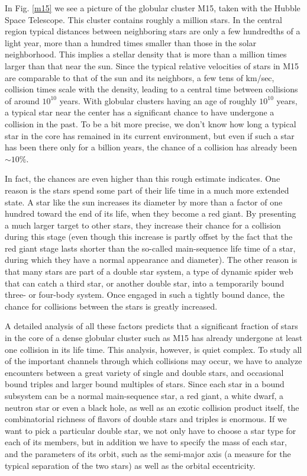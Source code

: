 \documentclass{book}
\begin{document}
In Fig. \ref{m15} we see a
picture of the globular cluster M15, taken with the Hubble Space
Telescope.  This cluster contains roughly a million stars.  In the
central region typical distances between neighboring stars are only a
few hundredths of a light year, more than a hundred times smaller than
those in the solar neighborhood.  This implies a stellar density that
is more than a million times larger than that near the sun.  Since the
typical relative velocities of stars in M15 are comparable to that of
the sun and its neighbors, a few tens of km/sec, collision times scale
with the density, leading to a central time between collisions of around
 $10^{10}$ years.  With globular clusters having an age of
roughly  $10^{10}$ years, a typical star near the center has
a significant chance to have undergone a collision in the past.  To be
a bit more precise, we don't know how long a typical star in the core
has remained in its current environment, but even if such a star has
been there only for a billion years, the chance of a collision has
already been  $\sim10\%$.

In fact, the chances are even higher than this rough estimate indicates.
One reason is the stars spend some part of their life time in a much
more extended state.  A star like the sun increases its diameter by
more than a factor of one hundred toward the end of its life, when
they become a red giant.  By presenting a much larger target to other
stars, they increase their chance for a collision during this stage
(even though this increase is partly offset by the fact that the red
giant stage lasts shorter than the so-called main-sequence life time
of a star, during which they have a normal appearance and diameter).
The other reason is that many stars are part of a double star system,
a type of dynamic spider web that can catch a third star, or another
double star, into a temporarily bound three- or four-body system.
Once engaged in such a tightly bound dance, the chance for collisions
between the stars is greatly increased.

A detailed analysis of all these factors predicts that a significant
fraction of stars in the core of a dense globular cluster such as M15
has already undergone at least one collision in its life time.  This
analysis, however, is quiet complex.  To study all of the important
channels through which collisions may occur, we have to analyze
encounters between a great variety of single and double stars, and
occasional bound triples and larger bound multiples of stars.  Since
each star in a bound subsystem can be a normal main-sequence star, a
red giant, a white dwarf, a neutron star or even a black hole, as well
as an exotic collision product itself, the combinatorial richness of
flavors of double stars and triples is enormous.  If we want to pick a
particular double star, we not only have to choose a star type for
each of its members, but in addition we have to specify the mass of
each star, and the parameters of its orbit, such as the semi-major axis
(a measure for the typical separation of the two stars) as well as the
orbital eccentricity.
\end{document}
